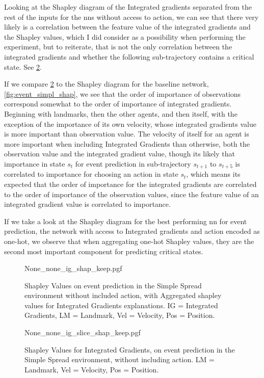 \documentclass[UKenglish]{uiomasterthesis}
\begin{document}
Looking at the Shapley diagram of the Integrated gradients separated from the rest of the inputs for the \acp{nn} without access to action, we can see that there very likely is a correlation between the feature value of the integrated gradients and the Shapley values, which I did consider as a possibility when performing the experiment, but to reiterate, that is not the only correlation between the integrated gradients and whether the following sub-trajectory contains a critical state. See \cref{fig:event_simpl_ig_slice}.

If we compare \cref{fig:event_simpl_ig_slice} to the Shapley diagram for the baseline network, \cref{fig:event_simpl_shap}, we see that the order of importance of observations correspond somewhat to the order of importance of integrated gradients. Beginning with landmarks, then the other agents, and then itself, with the exception of the importance of its own velocity, whose integrated gradients value is more important than observation value.
The velocity of itself for an agent is more important when including Integrated Gradients than otherwise, both the observation value and the integrated gradient value, though its likely that importance in state $s_t$ for event prediction in sub-trajectory $s_{t+1}$ to $s_{t+5}$ is correlated to importance for choosing an action in state $s_t$, which means its expected that the order of importance for the integrated gradients are correlated to the order of importance of the observation values, since the feature value of an integrated gradient value is correlated to importance.

If we take a look at the Shapley diagram for the best performing \ac{nn} for event prediction, the network with access to Integrated gradients and action encoded as one-hot, we observe that when aggregating one-hot Shapley values, they are the second most important component for predicting critical states. 

\begin{figure}[H]
    \centering
{None_none_ig_shap_keep.pgf}
\caption{Shapley Values on event prediction in the Simple Spread environment without included action, with Aggregated shapley values for Integrated Gradients explanations. IG = Integrated Gradients, LM = Landmark, Vel = Velocity, Pos = Position.}
\label{fig:event_simpl_ig_shap}
\end{figure}

\begin{figure}[H]
\centering
{None_none_ig_slice_shap_keep.pgf}
\caption{Shapley Values for Integrated Gradients, on event prediction in the Simple Spread environment, without including action. LM = Landmark, Vel = Velocity, Pos = Position.}
\label{fig:event_simpl_ig_slice}
\end{figure}
\end{document}
